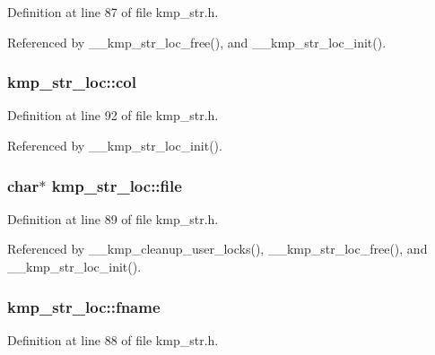 Definition at line 87 of file kmp\-\_\-str.\-h.



Referenced by \-\_\-\-\_\-kmp\-\_\-str\-\_\-loc\-\_\-free(), and \-\_\-\-\_\-kmp\-\_\-str\-\_\-loc\-\_\-init().

\hypertarget{structkmp__str__loc_aaee918129e8140c986d4381f85d3c6ce}{
\subsubsection[{col}]{ kmp\-\_\-str\-\_\-loc\-::col}}\label{structkmp__str__loc_aaee918129e8140c986d4381f85d3c6ce}


Definition at line 92 of file kmp\-\_\-str.\-h.



Referenced by \-\_\-\-\_\-kmp\-\_\-str\-\_\-loc\-\_\-init().

\hypertarget{structkmp__str__loc_a58c65f1c3edba40b585cc6b00525e9e2}{
\subsubsection[{file}]{\setlength{\rightskip}{0pt plus 5cm}char$\ast$ kmp\-\_\-str\-\_\-loc\-::file}}\label{structkmp__str__loc_a58c65f1c3edba40b585cc6b00525e9e2}


Definition at line 89 of file kmp\-\_\-str.\-h.



Referenced by \-\_\-\-\_\-kmp\-\_\-cleanup\-\_\-user\-\_\-locks(), \-\_\-\-\_\-kmp\-\_\-str\-\_\-loc\-\_\-free(), and \-\_\-\-\_\-kmp\-\_\-str\-\_\-loc\-\_\-init().

\hypertarget{structkmp__str__loc_a3c120d9ac1b6a294b7ff5e6015b9021f}{
\subsubsection[{fname}]{ kmp\-\_\-str\-\_\-loc\-::fname}}\label{structkmp__str__loc_a3c120d9ac1b6a294b7ff5e6015b9021f}


Definition at line 88 of file kmp\-\_\-str.\-h.



